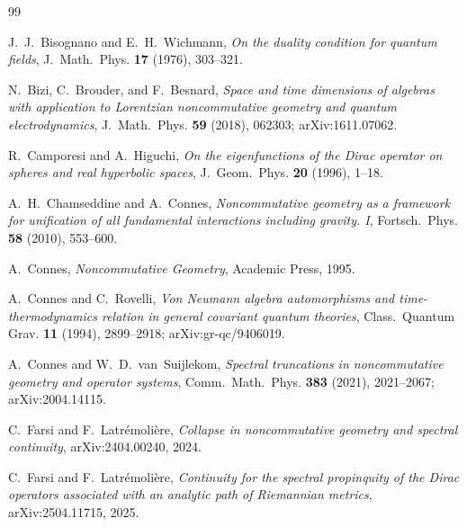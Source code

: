 \documentclass[11pt,a4paper]{article}
\theoremstyle{plain}
\theoremstyle{definition}
\begin{document}

\begin{thebibliography}{99}

J.~J.~Bisognano and E.~H.~Wichmann,
\newblock \emph{On the duality condition for quantum fields},
\newblock J.~Math.~Phys. \textbf{17} (1976), 303--321.

N.~Bizi, C.~Brouder, and F.~Besnard,
\newblock \emph{Space and time dimensions of algebras with
application to Lorentzian noncommutative geometry and quantum
electrodynamics},
\newblock J.~Math.~Phys. \textbf{59} (2018), 062303;
\newblock arXiv:1611.07062.

R.~Camporesi and A.~Higuchi,
\newblock \emph{On the eigenfunctions of the Dirac operator on
spheres and real hyperbolic spaces},
\newblock J.~Geom.~Phys. \textbf{20} (1996), 1--18.

A.~H.~Chamseddine and A.~Connes,
\newblock \emph{Noncommutative geometry as a framework for
unification of all fundamental interactions including gravity. I},
\newblock Fortsch.~Phys. \textbf{58} (2010), 553--600.

A.~Connes,
\newblock \emph{Noncommutative Geometry},
\newblock Academic Press, 1995.

A.~Connes and C.~Rovelli,
\newblock \emph{Von Neumann algebra automorphisms and
time-thermodynamics relation in general covariant quantum theories},
\newblock Class.~Quantum Grav. \textbf{11} (1994), 2899--2918;
\newblock arXiv:gr-qc/9406019.

A.~Connes and W.~D.~van~Suijlekom,
\newblock \emph{Spectral truncations in noncommutative geometry and
operator systems},
\newblock Comm.~Math.~Phys. \textbf{383} (2021), 2021--2067;
\newblock arXiv:2004.14115.

C.~Farsi and F.~Latr\'emoli\`ere,
\newblock \emph{Collapse in noncommutative geometry and spectral
continuity},
\newblock arXiv:2404.00240, 2024.

C.~Farsi and F.~Latr\'emoli\`ere,
\newblock \emph{Continuity for the spectral propinquity of the
Dirac operators associated with an analytic path of Riemannian
metrics},
\newblock arXiv:2504.11715, 2025.


\end{thebibliography}
\end{document}
